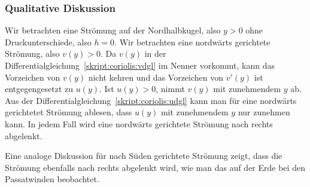 \subsubsection{Qualitative Diskussion}
Wir betrachten eine Strömung auf der Nordhalbkugel, also $y>0$ ohne
Druckunterschiede, also $h=0$.
Wir betrachten eine nordwärts gerichtete Strömung, also $v(y)>0$.
Da $v(y)$
in der Differentialgleichung~\eqref{skript:coriolis:vdgl}
im Nenner vorkommt, kann das Vorzeichen von $v(y)$ nicht kehren
und das Vorzeichen von $v'(y)$ ist entgegengesetzt zu $u(y)$.
Ist $u(y)>0$, nimmt $v(y)$ mit zunehmendem $y$ ab.
Aus der Differentialgleichung~\eqref{skript:coriolis:udgl} kann man für
eine nordwärts gerichtetet Strömung ablesen, dass $u(y)$ mit zunehmendem
$y$ nur zunehmen kann.
In jedem Fall wird eine nordwärts gerichtete Strömung nach rechts
abgelenkt.

Eine analoge Diskussion für nach Süden gerichtete Strömung zeigt, dass
die Strömung ebenfalls nach rechts abgelenkt wird, wie man das auf
der Erde bei den Passatwinden beobachtet.

